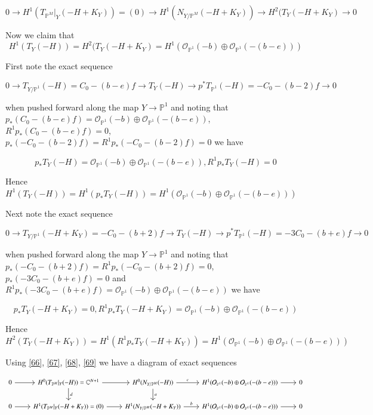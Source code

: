 \documentclass[11pt,twoside]{amsart}
\theoremstyle{plain}
\numberwithin{equation}{section}
\theoremstyle{definition}
\begin{document}
\begin{equation}\label{67}
0 \to H^1(T_{\mathbb{P}^M}|_Y (-H+K_Y)) = (0) \to H^1(N_{Y/\mathbb{P}^M}(-H+K_Y)) \to H^2(T_Y(-H+K_Y) \to 0
\end{equation}

Now we claim that $$H^1(T_Y(-H)) = H^2(T_Y(-H+K_Y) = H^1(\mathcal{O}_{\mathbb{P}^1}(-b) \oplus \mathcal{O}_{\mathbb{P}^1}(-(b-e)))$$

First note the exact sequence 

$$0 \to T_{Y/\mathbb{P}^1}(-H) = C_0-(b-e)f \to T_Y(-H) \to p^*T_{\mathbb{P}^1}(-H) = -C_0-(b-2)f \to 0 $$

when pushed forward along the map $Y \to \mathbb{P}^1$ and noting that $p_*(C_0-(b-e)f) = \mathcal{O}_{\mathbb{P}^1}(-b) \oplus \mathcal{O}_{\mathbb{P}^1}(-(b-e))$, $R^1p_*(C_0-(b-e)f) = 0$, $p_*(-C_0-(b-2)f) = R^1p_*(-C_0-(b-2)f) = 0$ we have 

\begin{equation}\label{68}
 p_*T_Y(-H) = \mathcal{O}_{\mathbb{P}^1}(-b) \oplus \mathcal{O}_{\mathbb{P}^1}(-(b-e)), R^1p_*T_Y(-H) = 0 
\end{equation}

Hence $H^1(T_Y(-H)) = H^1(p_*T_Y(-H)) = H^1(\mathcal{O}_{\mathbb{P}^1}(-b) \oplus \mathcal{O}_{\mathbb{P}^1}(-(b-e)))$

Next note the exact sequence 

$$0 \to T_{Y/\mathbb{P}^1}(-H+K_Y) = -C_0-(b+2)f \to T_Y(-H) \to p^*T_{\mathbb{P}^1}(-H) = -3C_0-(b+e)f \to 0 $$

when pushed forward along the map $Y \to \mathbb{P}^1$ and noting that $p_*(-C_0-(b+2)f) = R^1p_*(-C_0-(b+2)f) = 0$, $p_*(-3C_0-(b+e)f) = 0$ and $R^1p_*(-3C_0-(b+e)f) = \mathcal{O}_{\mathbb{P}^1}(-b) \oplus \mathcal{O}_{\mathbb{P}^1}(-(b-e))$ we have 

\begin{equation}\label{69}
 p_*T_Y(-H+K_Y) = 0, R^1p_*T_Y(-H+K_Y) =  \mathcal{O}_{\mathbb{P}^1}(-b) \oplus \mathcal{O}_{\mathbb{P}^1}(-(b-e))
\end{equation}

Hence $H^2(T_Y(-H+K_Y)) = H^1(R^1p_*T_Y(-H+K_Y)) = H^1(\mathcal{O}_{\mathbb{P}^1}(-b) \oplus \mathcal{O}_{\mathbb{P}^1}(-(b-e)))$

Using \ref{66}, \ref{67}, \ref{68}, \ref{69} we have a diagram of exact sequences

\[
\begin{tikzcd}
  0 \arrow[r] & H^0(T_{\mathbb{P}^M}|_Y (-H)) = \mathbb{C}^{N+1} \arrow[r] \arrow[d, "d"] & H^0(N_{Y/\mathbb{P}^M}(-H)) \arrow[r, "c"] \arrow[d, "a"] & H^1(\mathcal{O}_{\mathbb{P}^1}(-b) \oplus \mathcal{O}_{\mathbb{P}^1}(-(b-e))) \arrow[r] & 0 \\
  0 \arrow[r] & H^1(T_{\mathbb{P}^M}|_Y (-H+K_Y)) = (0) \arrow[r]  & H^1(N_{Y/\mathbb{P}^M}(-H+K_Y)) \arrow[r, "b"]  & H^1(\mathcal{O}_{\mathbb{P}^1}(-b) \oplus \mathcal{O}_{\mathbb{P}^1}(-(b-e))) \arrow[r] & 0
\end{tikzcd}
\]
\end{document}
